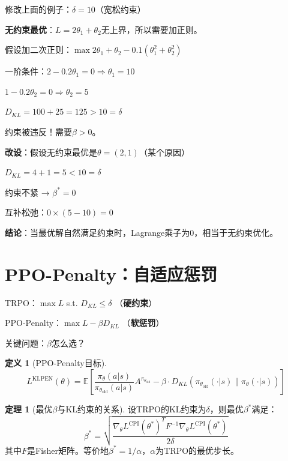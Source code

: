 \documentclass[11pt,a4paper]{article}
\theoremstyle{definition}
\newtheorem{definition}{定义}[section]
\newtheorem{theorem}{定理}[section]
\begin{document}
\begin{calculation}[手算：当约束不紧时$\beta = 0$]
修改上面的例子：$\delta = 10$（宽松约束）

\textbf{无约束最优}：$L = 2\theta_1 + \theta_2$无上界，所以需要加正则。

假设加二次正则：$\max 2\theta_1 + \theta_2 - 0.1(\theta_1^2 + \theta_2^2)$

一阶条件：$2 - 0.2\theta_1 = 0 \Rightarrow \theta_1 = 10$

$1 - 0.2\theta_2 = 0 \Rightarrow \theta_2 = 5$

$D_{KL} = 100 + 25 = 125 > 10 = \delta$

约束被违反！需要$\beta > 0$。

\textbf{改设}：假设无约束最优是$\theta = (2, 1)$（某个原因）

$D_{KL} = 4 + 1 = 5 < 10 = \delta$

约束不紧 → $\beta^* = 0$

互补松弛：$0 \times (5 - 10) = 0$ \checkmark

\textbf{结论}：当最优解自然满足约束时，Lagrange乘子为0，相当于无约束优化。
\end{calculation}

\section{PPO-Penalty：自适应惩罚}

\begin{plainwords}[从硬约束到软惩罚]
TRPO：$\max L$ s.t. $D_{KL} \leq \delta$ （\textbf{硬约束}）

PPO-Penalty：$\max L - \beta D_{KL}$ （\textbf{软惩罚}）

关键问题：$\beta$怎么选？
\end{plainwords}

\begin{definition}[PPO-Penalty目标]
\[
L^{\text{KLPEN}}(\theta) = \mathbb{E}\left[\frac{\pi_\theta(a|s)}{\pi_{\theta_{\text{old}}}(a|s)} A^{\pi_{\theta_{\text{old}}}} - \beta \cdot D_{KL}(\pi_{\theta_{\text{old}}}(\cdot|s) \| \pi_\theta(\cdot|s))\right]
\]
\end{definition}

\begin{theorem}[最优$\beta$与KL约束的关系]
设TRPO的KL约束为$\delta$，则最优$\beta^*$满足：
\[
\beta^* = \sqrt{\frac{\nabla_\theta L^{\text{CPI}}(\theta^*)^T F^{-1} \nabla_\theta L^{\text{CPI}}(\theta^*)}{2\delta}}
\]
其中$F$是Fisher矩阵。等价地$\beta^*=1/\alpha$，$\alpha$为TRPO的最优步长。
\end{theorem}
\end{document}
